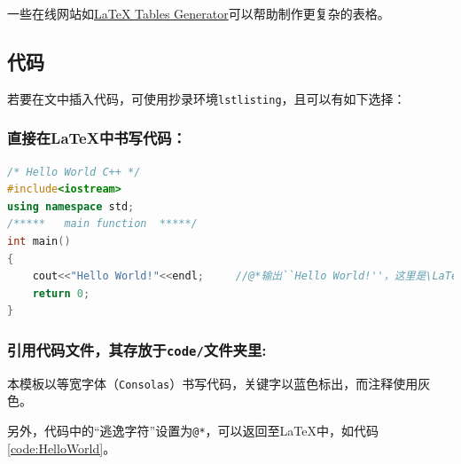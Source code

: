         一些在线网站如\href{http://www.tablesgenerator.com}{LaTeX Tables Generator}可以帮助制作更复杂的表格。
    
        \subsection{代码}\label{subsec:code}
        若要在文中插入代码，可使用抄录环境\texttt{lstlisting}，且可以有如下选择：
        \subsubsection{直接在\LaTeX{}中书写代码：}
            \begin{lstlisting}[language=C++,caption=Hello World,label=code:HelloWorld]
/* Hello World C++ */
#include<iostream>
using namespace std;
/*****   main function	*****/
int main()
{
    cout<<"Hello World!"<<endl;		//@*输出``Hello World!''，这里是\LaTeX{}！@*
    return 0;
}
            \end{lstlisting}
        \subsubsection{引用代码文件，其存放于\texttt{code/}文件夹里:}
            
        
        本模板以等宽字体（\texttt{Consolas}）书写代码，关键字以蓝色标出，而注释使用灰色。

        另外，代码中的``逃逸字符''设置为\texttt{@*}，可以返回至\LaTeX{}中，如代码\ref{code:HelloWorld}。
